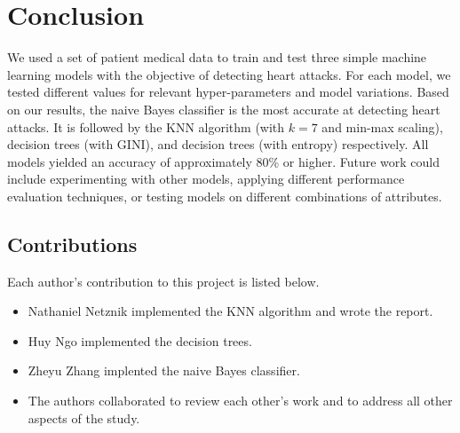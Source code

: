 \documentclass{article}
\begin{document}
\section{Conclusion}
We used a set of patient medical data to train and test three simple machine learning models with the objective of detecting heart attacks. For each model, we tested different values for relevant hyper-parameters and model variations. Based on our results, the naive Bayes classifier is the most accurate at detecting heart attacks. It is followed by the KNN algorithm (with $k=7$ and min-max scaling), decision trees (with GINI), and decision trees (with entropy) respectively. All models yielded an accuracy of approximately 80\% or higher. Future work could include experimenting with other models, applying different performance evaluation techniques, or testing models on different combinations of attributes.

\subsection{Contributions}
Each author's contribution to this project is listed below.
\begin{itemize}
\item Nathaniel Netznik implemented the KNN algorithm and wrote the report.
\item Huy Ngo implemented the decision trees.
\item Zheyu Zhang implented the naive Bayes classifier.
\item The authors collaborated to review each other's work and to address all other aspects of the study.
\end{itemize} 

\medskip


\end{document}

